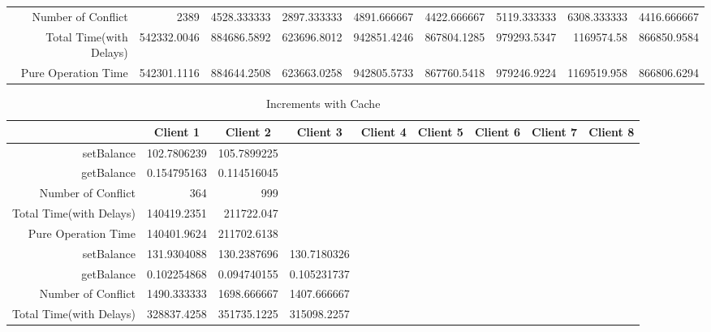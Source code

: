 \begin{landscape}
\begin{table}[htbp]
\begin{tabular}{rrrrrrrrr}
    Number of Conflict & 2389  & 4528.333333 & 2897.333333 & 4891.666667 & 4422.666667 & 5119.333333 & 6308.333333 & 4416.666667 \\
    Total Time(with Delays) & 542332.0046 & 884686.5892 & 623696.8012 & 942851.4246 & 867804.1285 & 979293.5347 & 1169574.58 & 866850.9584 \\
    Pure Operation Time & 542301.1116 & 884644.2508 & 623663.0258 & 942805.5733 & 867760.5418 & 979246.9224 & 1169519.958 & 866806.6294 \\
    \bottomrule
    \end{tabular}%
  \label{tab:increment with RMI}%
\end{table}%
\end{landscape}

\begin{landscape}
\begin{table}[htbp]
\scriptsize
  \centering
  \caption{Increments with Cache}
    \begin{tabular}{rrrrrrrrr}
    \toprule
          & \multicolumn{1}{c}{Client 1} & \multicolumn{1}{c}{Client 2} & \multicolumn{1}{c}{Client 3} & \multicolumn{1}{c}{Client 4} & \multicolumn{1}{c}{Client 5} & \multicolumn{1}{c}{Client 6} & \multicolumn{1}{c}{Client 7} & \multicolumn{1}{c}{Client 8} \\
    \midrule
    setBalance & 102.7806239 & 105.7899225 &       &       &       &       &       &  \\
    getBalance & 0.154795163 & 0.114516045 &       &       &       &       &       &  \\
    Number of Conflict & 364   & 999   &       &       &       &       &       &  \\
    Total Time(with Delays) & 140419.2351 & 211722.047 &       &       &       &       &       &  \\
    Pure Operation Time & 140401.9624 & 211702.6138 &       &       &       &       &       &  \\
\cline{1-9}     
    setBalance & 131.9304088 & 130.2387696 & 130.7180326 &       &       &       &       &  \\
    getBalance & 0.102254868 & 0.094740155 & 0.105231737 &       &       &       &       &  \\
    Number of Conflict & 1490.333333 & 1698.666667 & 1407.666667 &       &       &       &       &  \\
    Total Time(with Delays) & 328837.4258 & 351735.1225 & 315098.2257 &       &       &       &       &  \\

\end{tabular}
\end{table}
\end{landscape}
